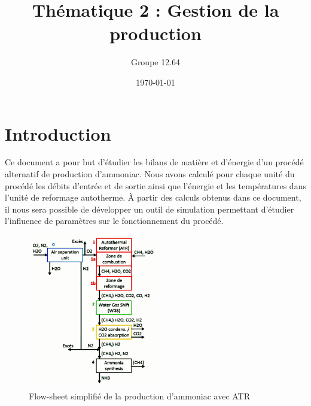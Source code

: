 \documentclass[french, a4paper, 10pt]{article}
\title{Thématique 2 : Gestion de la production}
\author{Groupe 12.64}
\date{\today}
\begin{document}

\tableofcontents\newpage

\part{Introduction}
Ce document a pour but d'étudier les bilans de matière et d'énergie d'un procédé alternatif de production d'ammoniac. Nous avons calculé pour chaque unité du procédé les débits d'entrée et de sortie ainsi que l'énergie et les températures dans l'unité de reformage autotherme. À partir des calculs obtenus dans ce document, il nous sera possible de développer un outil de simulation permettant d'étudier l'influence de paramètres sur le fonctionnement du procédé. 
\begin{figure}[h]
	\centering
	\includegraphics[width=0.5\textwidth]{pictures/procede.pdf}
	\caption{\label{fig:procede}Flow-sheet simplifié de la production d'ammoniac avec ATR}
\end{figure}
\end{document}
